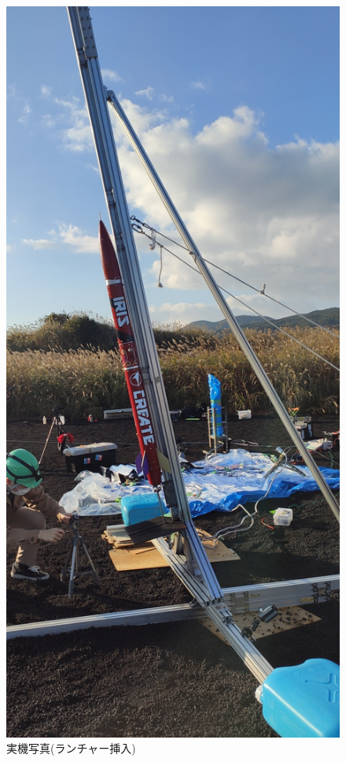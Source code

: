 \documentclass[a4paper,11pt,uplatex]{jsarticle}
\begin{document}
\begin{figure}[H]
	\centering
	\includegraphics[scale = 0.1]{pic_str/s_59_launcher.jpg}
	\caption{実機写真(ランチャー挿入)}
	\label{s_real2}
\end{figure}
\end{document}
